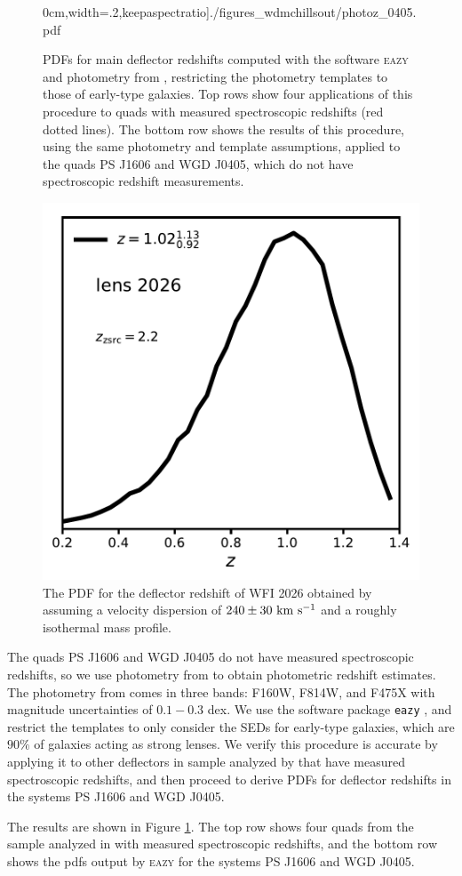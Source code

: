 \begin{figure}
	0cm,width=.2\textwidth,keepaspectratio]{./figures_wdmchillsout/photoz_0405.pdf}
	\caption[Distributions of main deflector redshifts]{\label{fig:photozs} PDFs for main deflector redshifts computed with the software {\textsc{eazy}} and photometry from \citet{Shajib++18}, restricting the photometry templates to those of early-type galaxies. Top rows show four applications of this procedure to quads with measured spectroscopic redshifts (red dotted lines). The bottom row shows the results of this procedure, using the same photometry and template assumptions, applied to the quads PS J1606 and WGD J0405, which do not have spectroscopic redshift measurements.}
\end{figure}	
\begin{figure}
	\centering
	\includegraphics[clip,trim=0cm 0cm 0cm
	0cm,width=.3\textwidth,keepaspectratio]{./figures_wdmchillsout/photoz_2026.pdf}
	\caption[Distribution of lens redshift for WFI 2026]{\label{fig:2026z} The PDF for the deflector redshift of WFI 2026 obtained by assuming a velocity dispersion of $240 \pm 30 \ \rm{km} \ \rm{s^{-1}}$ and a roughly isothermal mass profile. }
\end{figure}
The quads PS J1606 and WGD J0405 do not have measured spectroscopic redshifts, so we use photometry from \citet{Shajib++18} to obtain photometric redshift estimates. The photometry from \citet{Shajib++18} comes in three bands: F160W, F814W, and F475X with magnitude uncertainties of $0.1-0.3$ dex. We use the software package {\tt{eazy}} \citep{Brammer++08}, and restrict the templates to only consider the SEDs for early-type galaxies, which are $90\%$ of galaxies acting as strong lenses. We verify this procedure is accurate by applying it to other deflectors in sample analyzed by \citet{Shajib++18} that have measured spectroscopic redshifts, and  then proceed to derive PDFs for deflector redshifts in the systems PS J1606 and WGD J0405. 

The results are shown in Figure \ref{fig:photozs}. The top row shows four quads from the sample analyzed in \citep{Shajib++18} with measured spectroscopic redshifts, and the bottom row shows the pdfs output by {\textsc{eazy}} for the systems PS J1606 and WGD J0405. 


